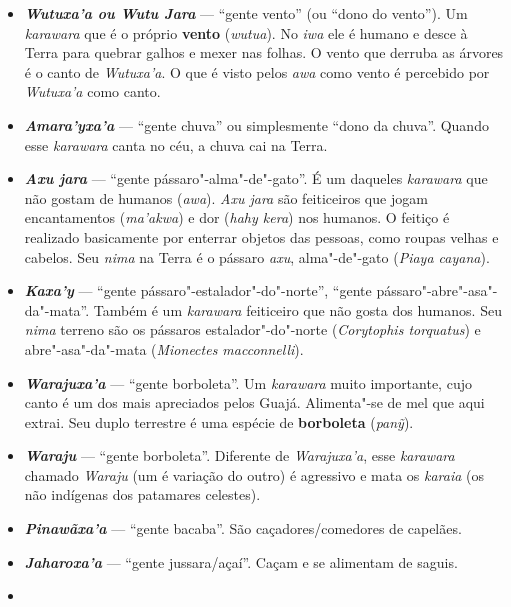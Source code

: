 \begin{itemize}
  \emph{\textbf{Itaxa'a}} --- ``gente pedra'' (também pode ser chamado de
  ``dono da pedra''). Caçadores de anta. Não à toa, a primeira anta,
  criada por \emph{Maira}, foi feita a partir de uma pedra.
\item
  \emph{\textbf{Wutuxa'a ou Wutu Jara}} --- ``gente vento'' (ou ``dono do
  vento''). Um \emph{karawara} que é o próprio \textbf{vento}
  (\emph{wutua}). No \emph{iwa} ele é humano e desce à Terra para
  quebrar galhos e mexer nas folhas. O vento que derruba as árvores é o
  canto de \emph{Wutuxa'a}. O que é visto pelos \emph{awa} como vento é
  percebido por \emph{Wutuxa'a} como canto.
\item
  \emph{\textbf{Amara'yxa'a}} --- ``gente chuva'' ou simplesmente ``dono da
  chuva''. Quando esse \emph{karawara} canta no céu, a chuva cai na
  Terra.
\item
  \emph{\textbf{Axu jara}} --- ``gente pássaro"-alma"-de"-gato''. É um
  daqueles \emph{karawara} que não gostam de humanos (\emph{awa}).
  \emph{Axu jara} são feiticeiros que jogam encantamentos
  (\emph{ma'akwa}) e dor (\emph{hahy kera}) nos humanos. O feitiço é
  realizado basicamente por enterrar objetos das pessoas, como roupas
  velhas e cabelos. Seu \emph{nima} na Terra é o pássaro \emph{axu},
  alma"-de"-gato (\emph{Piaya cayana}).
\item
  \emph{\textbf{Kaxa'y}} --- ``gente pássaro"-estalador"-do"-norte'',
  ``gente pássaro"-abre"-asa"-da"-mata''. Também é um \emph{karawara}
  feiticeiro que não gosta dos humanos. Seu \emph{nima} terreno são os
  pássaros estalador"-do"-norte (\emph{Corytophis torquatus}) e
  abre"-asa"-da"-mata (\emph{Mionectes macconnelli}).
\item
  \emph{\textbf{Warajuxa'a}} --- ``gente borboleta''. Um \emph{karawara}
  muito importante, cujo canto é um dos mais apreciados pelos Guajá.
  Alimenta"-se de mel que aqui extrai. Seu duplo terrestre é uma espécie
  de \textbf{borboleta} (\emph{panỹ}).
\item
  \emph{\textbf{Waraju}} --- ``gente borboleta''. Diferente de
  \emph{Warajuxa'a}, esse \emph{karawara} chamado \emph{Waraju} (um é
  variação do outro) é agressivo e mata os \emph{karaia} (os não
  indígenas dos patamares celestes).
\item
  \emph{\textbf{Pinawãxa'a}} --- ``gente bacaba''. São
  caçadores/comedores de capelães.
\item
  \emph{\textbf{Jaharoxa'a}} --- ``gente jussara/açaí''. Caçam e se
  alimentam de saguis.
\item

\end{itemize}
